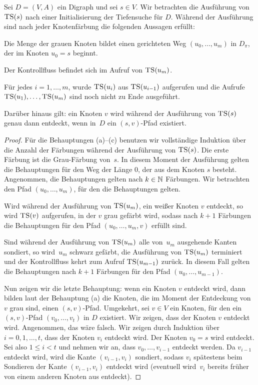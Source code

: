 \begin{lem} \label{ts:key:lemma} 
	Sei $D=(V,A)$ ein Digraph und sei $s \in V$. Wir betrachten die Ausführung von $\mathop{\text{\textsc{TS}}}(s)$ nach einer Initialisierung der Tiefensuche für $D$. Während der Ausführung sind nach jeder Knotenfärbung die folgenden Aussagen erfüllt:
	\begin{enuma} 
		\item Die Menge der grauen Knoten bildet einen gerichteten Weg $(u_0,\ldots,u_m)$ in $D_\pi$, der im Knoten $u_0=s$ beginnt. 
		\item Der Kontrollfluss befindet sich im Aufruf von $\mathop{\text{\textsc{TS}}}(u_m)$. 
		\item Für jedes $i=1,\ldots,m$, wurde $\mathop{\text{\textsc{TS}}}(u_i)$  aus $\mathop{\text{\textsc{TS}}}(u_{i-1})$ aufgerufen und die Aufrufe $\mathop{\text{\textsc{TS}}}(u_1),\ldots,\mathop{\text{\textsc{TS}}}(u_m)$ sind noch nicht zu Ende ausgeführt. 
	\end{enuma} 
	Darüber hinaus gilt: ein Knoten $v$ wird während der Ausführung von $\mathop{\text{\textsc{TS}}}(s)$ genau dann entdeckt, wenn in~$D$ ein $(s,v)$-Pfad existiert. 
\end{lem} 
\begin{proof}
	Für die Behauptungen (a)--(c) benutzen wir vollständige Induktion über die Anzahl der Färbungen während der Ausführung von $\mathop{\text{\textsc{TS}}}(s)$. Die erste Färbung ist die Grau-Färbung von~$s$. In diesem Moment der Ausführung gelten die Behauptungen für den Weg der Länge $0$, der aus dem Knoten $s$ besteht. Angenommen, die Behauptungen gelten nach $k \in\mathbb{N}$ Färbungen. Wir betrachten den Pfad $(u_0,\ldots,u_m)$, für den die Behauptungen gelten.
	
	Wird während der Ausführung von $\mathop{\text{\textsc{TS}}}(u_m)$, ein weißer Knoten $v$ entdeckt, so wird $\mathop{\text{\textsc{TS}}}(v)$ aufgerufen, in der $v$ grau gefärbt wird, sodass nach $k+1$ Färbungen die Behauptungen für den Pfad $(u_0,\ldots,u_m,v)$ erfüllt sind. 
	
	Sind während der Ausführung von $\mathop{\text{\textsc{TS}}}(u_m)$ alle von~$u_m$ ausgehende Kanten sondiert, so wird~$u_m$ schwarz gefärbt, die Ausführung von $\mathop{\text{\textsc{TS}}}(u_m)$ terminiert und der Kontrollfluss kehrt zum Aufruf $\mathop{\text{\textsc{TS}}}(u_{m-1})$ zurück. In diesem Fall gelten die Behauptungen nach $k+1$ Färbungen für den Pfad $(u_0,\ldots,u_{m-1})$. 
	
\condclearpage

	Nun zeigen wir die letzte Behauptung: wenn ein Knoten $v$ entdeckt wird, dann bilden laut der Behauptung (a) die Knoten, die im Moment der Entdeckung von $v$ grau sind, einen $(s,v)$-Pfad. Umgekehrt, sei $v \in V$ ein Knoten, für den ein $(s,v)$-Pfad $(v_0,\ldots,v_t)$ in $D$ existiert. Wir zeigen, dass der Knoten $v$ entdeckt wird. Angenommen, das wäre falsch. Wir zeigen durch Induktion über $i=0,1,\ldots,t$, dass der Knoten $v_i$ entdeckt wird. Der Knoten $v_0=s$ wird entdeckt. Sei also $1 \le i < t$ und nehmen wir an, dass $v_0,\ldots,v_{i-1}$ entdeckt werden. Da $v_{i-1}$ entdeckt wird, wird die Kante $(v_{i-1},v_i)$ sondiert, sodass $v_i$ spätestens beim Sondieren der Kante $(v_{i-1},v_i)$ entdeckt wird (eventuell wird~$v_i$ bereits früher von einem anderen Knoten aus entdeckt). 
\end{proof} 

